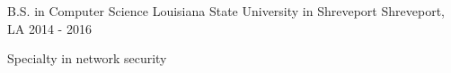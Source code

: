 

\begin{cventries}

  \cventry
    {B.S. in Computer Science} %
    {Louisiana State University in Shreveport} %
    {Shreveport, LA} %
    {2014 - 2016} %
    {
      \begin{cvitems} %
        \item {Specialty in network security}
      \end{cvitems}
    }

\end{cventries}
